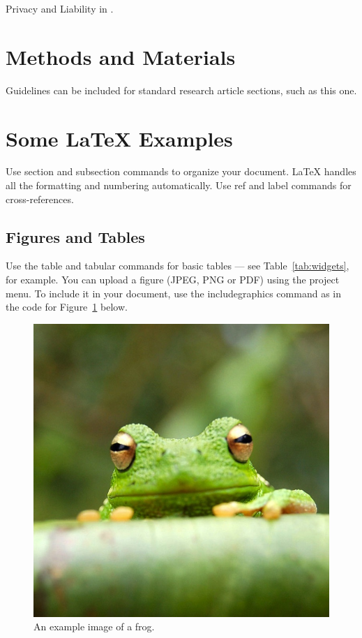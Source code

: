 \documentclass[fleqn,11pt]{olplainarticle}
\begin{document}
Privacy and Liability in \cite{schalk2008brain}.

\section*{Methods and Materials}

Guidelines can be included for standard research article sections, such as this one.

\section*{Some \LaTeX{} Examples}
\label{sec:examples}

Use section and subsection commands to organize your document. \LaTeX{} handles all the formatting and numbering automatically. Use ref and label commands for cross-references.

\subsection*{Figures and Tables}

Use the table and tabular commands for basic tables --- see Table~\ref{tab:widgets}, for example. You can upload a figure (JPEG, PNG or PDF) using the project menu. To include it in your document, use the includegraphics command as in the code for Figure~\ref{fig:view} below.

\begin{figure}[ht]
\centering
\includegraphics[width=0.7\linewidth]{frog}
\caption{An example image of a frog.}
\label{fig:view}
\end{figure}
\end{document}
